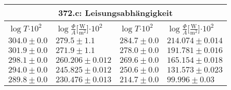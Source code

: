 \documentclass{article}
\begin{document}
\begin{tabular}{|p{3cm}|p{3cm}||p{3cm}|p{3cm}|}
\hline
\multicolumn{4}{|c|}{372.c: Leisungsabhängigkeit}\\
\hline
$\log{T}$$\cdot 10^{2}$&$\log{\frac{\Phi}{A}}$[$\frac{\textrm{W}}{\textrm{m}^2}$]$\cdot 10^{2}$&$\log{T}$$\cdot 10^{2}$&$\log{\frac{\Phi}{A}}$[$\frac{\textrm{W}}{\textrm{m}^2}$]$\cdot 10^{2}$\\
\hline
$304.0\pm0.0$&$279.5\pm 1.1$&$284.7\pm0.0$&$214.074\pm 0.014$\\
$301.9\pm0.0$&$271.9\pm 1.1$&$278.0\pm0.0$&$191.781\pm 0.016$\\
$298.1\pm0.0$&$260.206\pm 0.012$&$269.6\pm0.0$&$165.154\pm 0.018$\\
$294.0\pm0.0$&$245.825\pm 0.012$&$250.6\pm0.0$&$131.573\pm 0.023$\\
$289.8\pm0.0$&$230.476\pm 0.013$&$214.7\pm0.0$&$99.996\pm 0.03$\\
\hline
\end{tabular}
\end{document}

